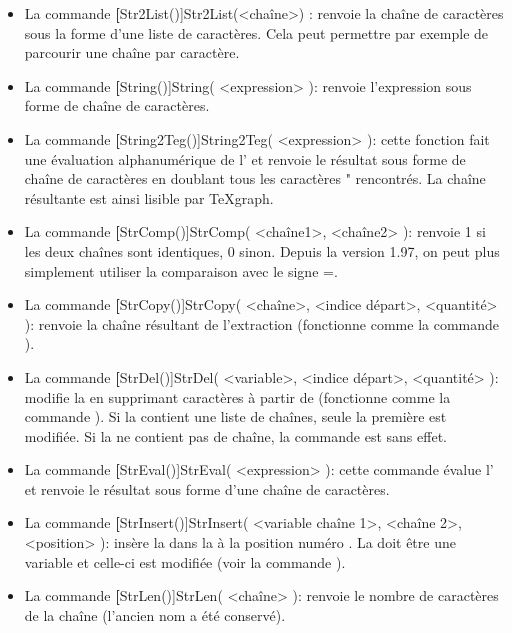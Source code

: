\begin{itemize}
\item La commande \textbf[Str2List()]{Str2List(<chaîne>)} : renvoie la chaîne de caractères sous la forme d'une liste de caractères. Cela peut permettre par exemple de parcourir une chaîne par caractère.

\item La commande \textbf[String()]{String( <expression> )}: renvoie l'expression sous forme de chaîne de caractères.

\item La commande \textbf[String2Teg()]{String2Teg( <expression> )}: cette fonction fait une évaluation alphanumérique de l' et renvoie le résultat sous forme de chaîne de caractères en doublant tous les caractères " rencontrés. La chaîne résultante est ainsi lisible par TeXgraph.

\item La commande \textbf[StrComp()]{StrComp( <chaîne1>, <chaîne2> )}: renvoie 1 si les deux chaînes sont identiques, 0 sinon. Depuis la version 1.97, on peut plus simplement utiliser la comparaison avec le signe =.

\item La commande \textbf[StrCopy()]{StrCopy( <chaîne>, <indice départ>, <quantité> )}: renvoie la chaîne résultant de l'extraction (fonctionne comme la commande ).

\item La commande \textbf[StrDel()]{StrDel( <variable>, <indice départ>, <quantité> )}: modifie la  en supprimant  caractères à partir de  (fonctionne comme la commande ). Si la  contient une liste de chaînes, seule la première est modifiée. Si la  ne contient pas de chaîne, la commande est sans effet.

\item La commande \textbf[StrEval()]{StrEval( <expression> )}: cette commande évalue l' et renvoie le résultat sous forme d'une chaîne de caractères.

\item La commande \textbf[StrInsert()]{StrInsert( <variable chaîne 1>, <chaîne 2>, <position> )}: insère la  dans la  à la position numéro . La  doit être une variable et celle-ci est modifiée (voir la commande ).

\item La commande \textbf[StrLen()]{StrLen( <chaîne> )}: renvoie le nombre de caractères de la chaîne (l'ancien nom  a été conservé).


\end{itemize}
